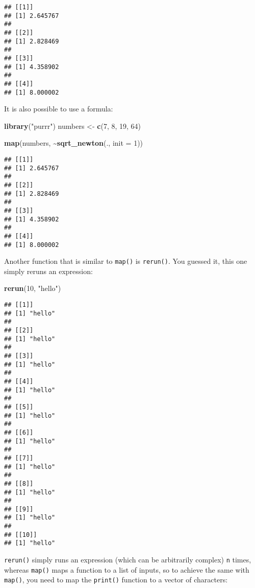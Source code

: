 \documentclass[
]{article}
\newenvironment{Shaded}{\begin{snugshade}}{\end{snugshade}}
\newcommand{\DataTypeTok}[1]{\textcolor[rgb]{0.13,0.29,0.53}{#1}}
\newcommand{\DecValTok}[1]{\textcolor[rgb]{0.00,0.00,0.81}{#1}}
\newcommand{\KeywordTok}[1]{\textcolor[rgb]{0.13,0.29,0.53}{\textbf{#1}}}
\newcommand{\NormalTok}[1]{#1}
\newcommand{\OperatorTok}[1]{\textcolor[rgb]{0.81,0.36,0.00}{\textbf{#1}}}
\newcommand{\StringTok}[1]{\textcolor[rgb]{0.31,0.60,0.02}{#1}}
\begin{document}
\begin{verbatim}
## [[1]]
## [1] 2.645767
## 
## [[2]]
## [1] 2.828469
## 
## [[3]]
## [1] 4.358902
## 
## [[4]]
## [1] 8.000002
\end{verbatim}

It is also possible to use a formula:

\begin{Shaded}
\begin{Highlighting}[]
\KeywordTok{library}\NormalTok{(}\StringTok{"purrr"}\NormalTok{)}
\NormalTok{numbers \textless{}{-}}\StringTok{ }\KeywordTok{c}\NormalTok{(}\DecValTok{7}\NormalTok{, }\DecValTok{8}\NormalTok{, }\DecValTok{19}\NormalTok{, }\DecValTok{64}\NormalTok{)}

\KeywordTok{map}\NormalTok{(numbers, }\OperatorTok{\textasciitilde{}}\KeywordTok{sqrt\_newton}\NormalTok{(., }\DataTypeTok{init =} \DecValTok{1}\NormalTok{))}
\end{Highlighting}
\end{Shaded}

\begin{verbatim}
## [[1]]
## [1] 2.645767
## 
## [[2]]
## [1] 2.828469
## 
## [[3]]
## [1] 4.358902
## 
## [[4]]
## [1] 8.000002
\end{verbatim}

Another function that is similar to \texttt{map()} is \texttt{rerun()}. You guessed it, this one simply
reruns an expression:

\begin{Shaded}
\begin{Highlighting}[]
\KeywordTok{rerun}\NormalTok{(}\DecValTok{10}\NormalTok{, }\StringTok{"hello"}\NormalTok{)}
\end{Highlighting}
\end{Shaded}

\begin{verbatim}
## [[1]]
## [1] "hello"
## 
## [[2]]
## [1] "hello"
## 
## [[3]]
## [1] "hello"
## 
## [[4]]
## [1] "hello"
## 
## [[5]]
## [1] "hello"
## 
## [[6]]
## [1] "hello"
## 
## [[7]]
## [1] "hello"
## 
## [[8]]
## [1] "hello"
## 
## [[9]]
## [1] "hello"
## 
## [[10]]
## [1] "hello"
\end{verbatim}

\texttt{rerun()} simply runs an expression (which can be arbitrarily complex) \texttt{n} times, whereas \texttt{map()}
maps a function to a list of inputs, so to achieve the same with \texttt{map()}, you need to map the \texttt{print()}
function to a vector of characters:
\end{document}

